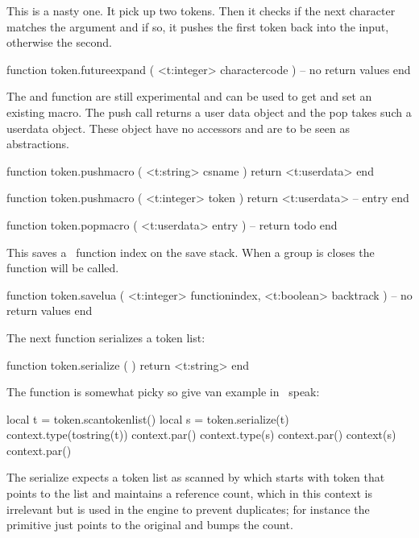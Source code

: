 \stopsubsection

\startsubsection[title={Macros}]

This is a nasty one. It pick up two tokens. Then it checks if the next character
matches the argument and if so, it pushes the first token back into the input,
otherwise the second.

\starttyping[option=LUA]
function token.futureexpand ( <t:integer> charactercode )
    -- no return values
end
\stoptyping

The  and  function are still experimental and
can be used to get and set an existing macro. The push call returns a user data
object and the pop takes such a userdata object. These object have no accessors
and are to be seen as abstractions.

\starttyping[option=LUA]
function token.pushmacro ( <t:string> csname )
    return <t:userdata>
end

function token.pushmacro ( <t:integer> token )
    return <t:userdata> -- entry
end
\stoptyping

\starttyping[option=LUA]
function token.popmacro ( <t:userdata> entry )
    -- return todo
end
\stoptyping

This saves a \LUA\ function index on the save stack. When a group is closes the
function will be called.

\starttyping[option=LUA]
function token.savelua ( <t:integer> functionindex, <t:boolean> backtrack )
    -- no return values
end
\stoptyping

The next function serializes a token list:

\starttyping[option=LUA]
function token.serialize ( )
    return <t:string>
end
\stoptyping

The function is somewhat picky so give van example in \CONTEXT\ speak:

\startbuffer
\startluacode
    local t = token.scantokenlist()
    local s = token.serialize(t)
    context.type(tostring(t)) context.par()
    context.type(s)           context.par()
    context(s)                context.par()
\stopbuffer

\typebuffer

The serialize expects a token list as scanned by  which
starts with token that points to the list and maintains a reference count, which
in this context is irrelevant but is used in the engine to prevent duplicates;
for instance the \type {\let} primitive just points to the original and bumps the
count.

